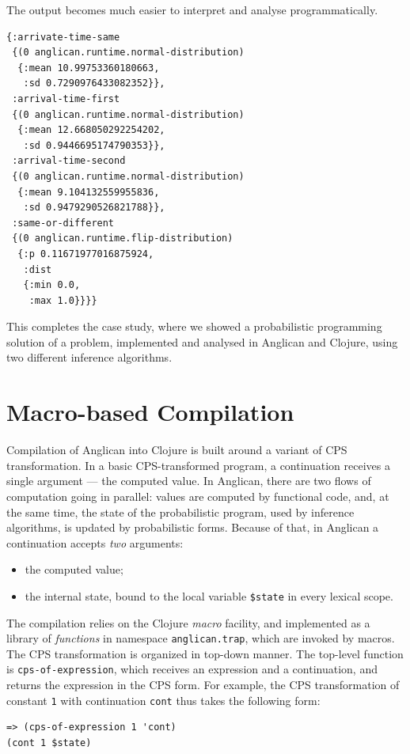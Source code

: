 \documentclass[preprint]{sigplanconf}
\begin{document}
The output becomes much easier to interpret and analyse
programmatically.

\begin{lstlisting}[style=default]
{:arrivate-time-same
 {(0 anglican.runtime.normal-distribution)
  {:mean 10.99753360180663,
   :sd 0.7290976433082352}},
 :arrival-time-first
 {(0 anglican.runtime.normal-distribution)
  {:mean 12.668050292254202,
   :sd 0.9446695174790353}},
 :arrival-time-second
 {(0 anglican.runtime.normal-distribution)
  {:mean 9.104132559955836,
   :sd 0.9479290526821788}},
 :same-or-different
 {(0 anglican.runtime.flip-distribution)
  {:p 0.11671977016875924,
   :dist
   {:min 0.0,
    :max 1.0}}}}
\end{lstlisting}

This completes the case study, where we showed a probabilistic
programming solution of a problem, implemented and analysed in
Anglican and Clojure, using two different inference algorithms.

\section{Macro-based Compilation}
\label{sec:compilation}

Compilation of Anglican into Clojure is built around a variant of CPS
transformation. In a basic CPS-transformed program, a
continuation receives a single argument --- the computed value.
In Anglican, there are two flows of computation going in
parallel: values are computed by functional code, and,
at the same time, the state of the probabilistic program,
used by inference algorithms, is updated by
probabilistic forms. Because of that, in Anglican a continuation
accepts  \textit{two} arguments:
\begin{itemize}
    \item the computed value;
    \item the internal state, bound to the local variable
        \texttt{\$state} in every lexical scope.
\end{itemize}

The compilation relies on the Clojure \textit{macro} facility,
and implemented as a library of \textit{functions} in namespace
\texttt{anglican.trap}, which are invoked by macros.  The CPS
transformation is organized in top-down manner.  The top-level
function is  \texttt{cps-of-expression}, which receives an
expression and a continuation, and returns the expression in the
CPS form.  For example, the CPS transformation of constant
\texttt{1} with continuation \texttt{cont} thus takes the
following form:
\begin{lstlisting}[style=default]
=> (cps-of-expression 1 'cont)
(cont 1 $state)
\end{lstlisting}
\end{document}

